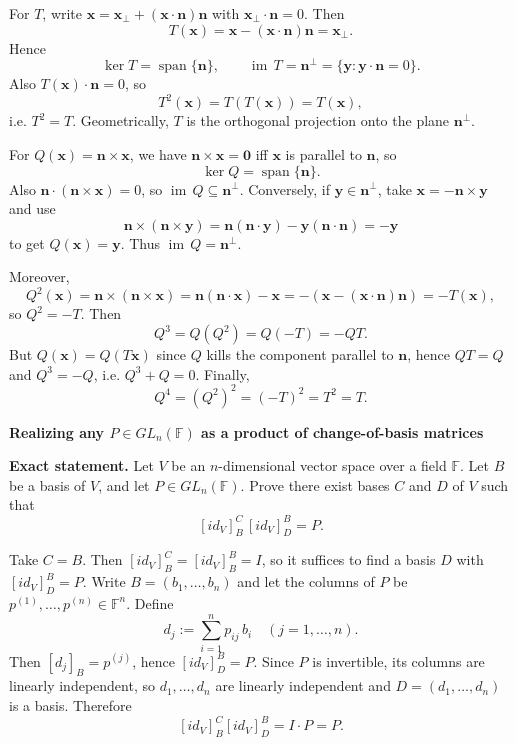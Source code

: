 \begin{solution}
For $T$, write $\mathbf x=\mathbf x_\perp+(\mathbf x\cdot\mathbf n)\mathbf n$ with $\mathbf x_\perp\cdot\mathbf n=0$. Then
\[
T(\mathbf x)=\mathbf x-(\mathbf x\cdot\mathbf n)\mathbf n=\mathbf x_\perp.
\]
Hence
\[
\ker T=\operatorname{span}\{\mathbf n\},\qquad \operatorname{im}\,T=\mathbf n^\perp=\{\mathbf y:\mathbf y\cdot\mathbf n=0\}.
\]
Also $T(\mathbf x)\cdot\mathbf n=0$, so
\[
T^2(\mathbf x)=T(T(\mathbf x))=T(\mathbf x),
\]
i.e. $T^2=T$. Geometrically, $T$ is the orthogonal projection onto the plane $\mathbf n^\perp$.

For $Q(\mathbf x)=\mathbf n\times\mathbf x$, we have $\mathbf n\times\mathbf x=\mathbf 0$ iff $\mathbf x$ is parallel to $\mathbf n$, so
\[
\ker Q=\operatorname{span}\{\mathbf n\}.
\]
Also $\mathbf n\cdot(\mathbf n\times\mathbf x)=0$, so $\operatorname{im}\,Q\subseteq \mathbf n^\perp$. Conversely, if $\mathbf y\in\mathbf n^\perp$, take $\mathbf x=-\mathbf n\times\mathbf y$ and use
\[
\mathbf n\times(\mathbf n\times\mathbf y)=\mathbf n(\mathbf n\cdot\mathbf y)-\mathbf y(\mathbf n\cdot\mathbf n)=-\mathbf y
\]
to get $Q(\mathbf x)=\mathbf y$. Thus $\operatorname{im}\,Q=\mathbf n^\perp$.

Moreover,
\[
Q^2(\mathbf x)=\mathbf n\times(\mathbf n\times\mathbf x)=\mathbf n(\mathbf n\cdot\mathbf x)-\mathbf x
=-(\mathbf x-(\mathbf x\cdot\mathbf n)\mathbf n)=-T(\mathbf x),
\]
so $Q^2=-T$. Then
\[
Q^3=Q(Q^2)=Q(-T)=-QT.
\]
But $Q(\mathbf x)=Q(T\mathbf x)$ since $Q$ kills the component parallel to $\mathbf n$, hence $QT=Q$ and $Q^3=-Q$, i.e. $Q^3+Q=0$.
Finally,
\[
Q^4=(Q^2)^2=(-T)^2=T^2=T.
\]
\end{solution}

\begin{problem}[CP-I-0121]
\label{prob:cp-i-0121}
\textbf{Realizing any \(P\in GL_n(\mathbb F)\) as a product of change-of-basis matrices}

\textbf{Exact statement.}
\hspace*{1.5em}Let \(V\) be an \(n\)-dimensional vector space over a field \(\mathbb F\). Let \(B\) be a basis of \(V\), and let \(P\in GL_n(\mathbb F)\).
Prove there exist bases \(C\) and \(D\) of \(V\) such that
\[
[id_V]^{C}_{B}\,[id_V]^{B}_{D}=P.
\]
\end{problem}

\begin{solution}
Take \(C=B\). Then \([id_V]^C_B=[id_V]^B_B=I\), so it suffices to find a basis \(D\) with \([id_V]^B_D=P\).
Write \(B=(b_1,\dots,b_n)\) and let the columns of \(P\) be \(p^{(1)},\dots,p^{(n)}\in\mathbb F^n\).
Define
\[
d_j := \sum_{i=1}^n p_{ij}\,b_i \quad (j=1,\dots,n).
\]
Then \([d_j]_B=p^{(j)}\), hence \([id_V]^B_D=P\).
Since \(P\) is invertible, its columns are linearly independent, so \(d_1,\dots,d_n\) are linearly independent and \(D=(d_1,\dots,d_n)\) is a basis.
Therefore
\[
[id_V]^C_B[id_V]^B_D=I\cdot P=P.
\]
\end{solution}

